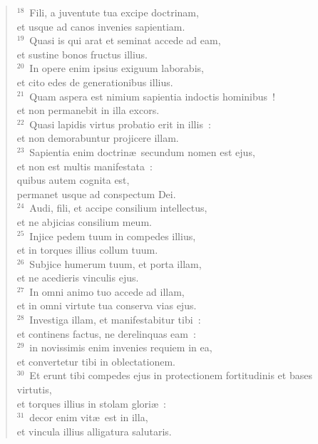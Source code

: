 \begin{verse}${}^{18}$~Fili, a juventute tua excipe doctrinam,\\ et usque ad canos invenies sapientiam.\\
${}^{19}$~Quasi is qui arat et seminat accede ad eam,\\ et sustine bonos fructus illius.\\
${}^{20}$~In opere enim ipsius exiguum laborabis,\\ et cito edes de generationibus illius.\\
${}^{21}$~Quam aspera est nimium sapientia indoctis hominibus~!\\ et non permanebit in illa excors.\\
${}^{22}$~Quasi lapidis virtus probatio erit in illis~:\\ et non demorabuntur projicere illam.\\
${}^{23}$~Sapientia enim doctrin\ae\ secundum nomen est ejus,\\ et non est multis manifestata~:\\ quibus autem cognita est,\\ permanet usque ad conspectum Dei.\\
${}^{24}$~Audi, fili, et accipe consilium intellectus,\\ et ne abjicias consilium meum.\\
${}^{25}$~Injice pedem tuum in compedes illius,\\ et in torques illius collum tuum.\\
${}^{26}$~Subjice humerum tuum, et porta illam,\\ et ne acedieris vinculis ejus.\\
${}^{27}$~In omni animo tuo accede ad illam,\\ et in omni virtute tua conserva vias ejus.\\
${}^{28}$~Investiga illam, et manifestabitur tibi~:\\ et continens factus, ne derelinquas eam~:\\
${}^{29}$~in novissimis enim invenies requiem in ea,\\ et convertetur tibi in oblectationem.\\
${}^{30}$~Et erunt tibi compedes ejus in protectionem fortitudinis et bases virtutis,\\ et torques illius in stolam glori\ae~:\\
${}^{31}$~decor enim vit\ae\ est in illa,\\ et vincula illius alligatura salutaris.\\

\end{verse}
